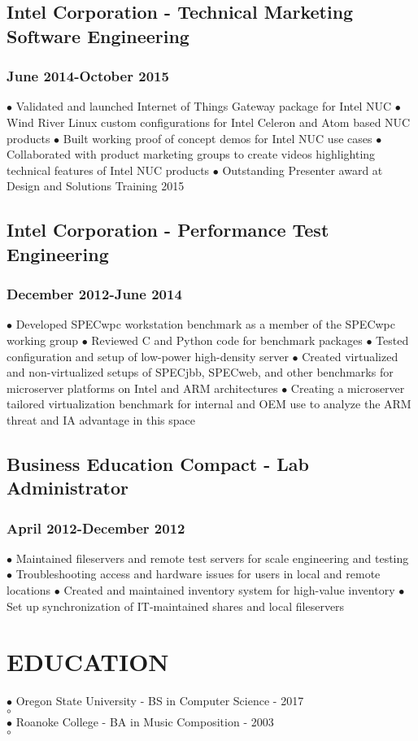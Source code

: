 \documentclass{article}
\begin{document}
\subsection*{Intel Corporation - Technical Marketing Software Engineering}
\subsubsection*{June 2014-October 2015}

$\bullet$ Validated and launched Internet of Things Gateway package for Intel NUC
$\bullet$ Wind River Linux custom configurations for Intel Celeron and Atom based NUC products
$\bullet$ Built working proof of concept demos for Intel NUC use cases 
$\bullet$ Collaborated with product marketing groups to create videos highlighting technical features of Intel NUC products
$\bullet$ Outstanding Presenter award at Design and Solutions Training 2015  


\subsection*{Intel Corporation - Performance Test Engineering}
\subsubsection*{December 2012-June 2014}

$\bullet$ Developed SPECwpc workstation benchmark as a member of the SPECwpc working group
$\bullet$ Reviewed C and Python code for benchmark packages
$\bullet$ Tested configuration and setup of low-power high-density server
$\bullet$ Created virtualized and non-virtualized setups of SPECjbb, SPECweb, and other benchmarks for microserver platforms on Intel and ARM architectures
$\bullet$ Creating a microserver tailored virtualization benchmark for internal and OEM use to analyze the ARM threat and IA advantage in this space

\subsection*{Business Education Compact - Lab Administrator}
\subsubsection*{April 2012-December 2012}

$\bullet$ Maintained fileservers and remote test servers for scale engineering and testing
$\bullet$ Troubleshooting access and hardware issues for users in local and remote locations
$\bullet$ Created and maintained inventory system for high-value inventory
$\bullet$ Set up synchronization of IT-maintained shares and local fileservers

\section*{EDUCATION}

$\bullet$ Oregon State University - BS in Computer Science - 2017\\
$  \circ$ \\
$\bullet$ Roanoke College - BA in Music Composition - 2003\\
$  \circ$ \\
\end{document}
